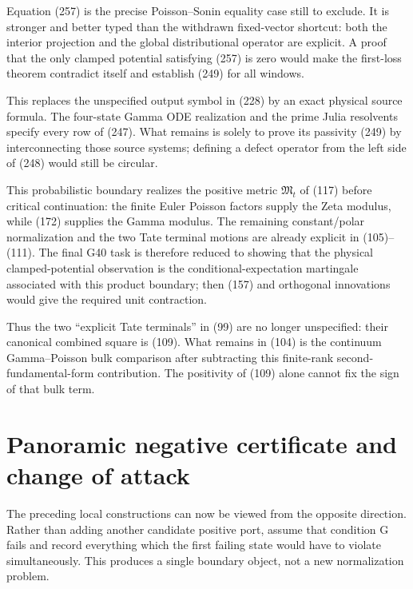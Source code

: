 \documentclass[11pt]{article}
\begin{document}
Equation (257) is the precise Poisson--Sonin equality case still to exclude.
It is stronger and better typed than the withdrawn fixed-vector shortcut:
both the interior projection and the global distributional operator are
explicit.  A proof that the only clamped potential satisfying (257) is zero
would make the first-loss theorem contradict itself and establish (249) for
all windows.

This replaces the unspecified output symbol in (228) by an exact physical
source formula.  The four-state Gamma ODE realization and the prime Julia
resolvents specify every row of (247).  What remains is solely to prove its
passivity (249) by interconnecting those source systems; defining a defect
operator from the left side of (248) would still be circular.

This probabilistic boundary realizes the positive metric
$\mathfrak M_t$ of (117) before critical continuation: the finite Euler
Poisson factors supply the Zeta modulus, while (172) supplies the Gamma
modulus.  The remaining constant/polar normalization and the two Tate
terminal motions are already explicit in (105)--(111).  The final G40 task
is therefore reduced to showing that the physical clamped-potential
observation is the conditional-expectation martingale associated with this
product boundary; then (157) and orthogonal innovations would give the
required unit contraction.

Thus the two ``explicit Tate terminals'' in (99) are no longer unspecified:
their canonical combined square is (109).  What remains in (104) is the
continuum Gamma--Poisson bulk comparison after subtracting this finite-rank
second-fundamental-form contribution.  The positivity of (109) alone cannot
fix the sign of that bulk term.

\section{Panoramic negative certificate and change of attack}

The preceding local constructions can now be viewed from the opposite
direction.  Rather than adding another candidate positive port, assume that
condition G fails and record everything which the first failing state would
have to violate simultaneously.  This produces a single boundary object,
not a new normalization problem.
\end{document}
